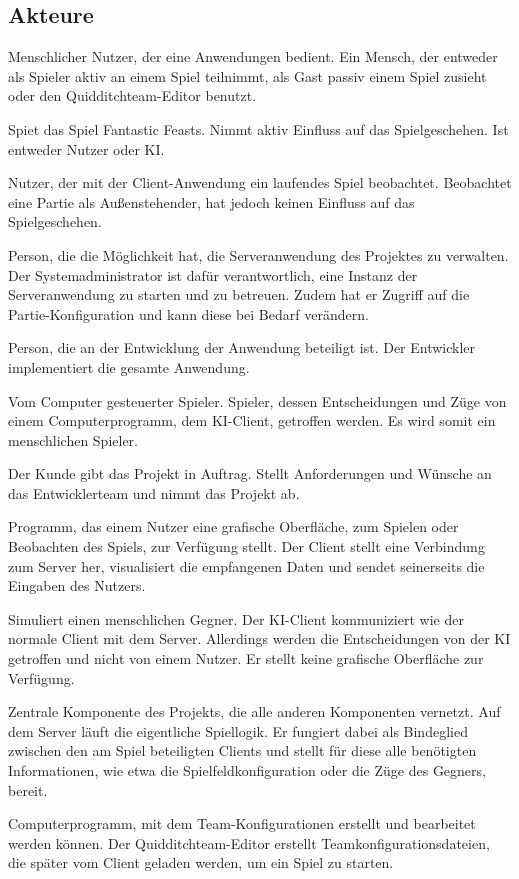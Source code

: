 \subsection{Akteure}

        {Menschlicher Nutzer, der eine Anwendungen bedient.}
        {Ein Mensch, der entweder als Spieler aktiv an einem Spiel teilnimmt, als Gast passiv einem Spiel zusieht oder den Quidditchteam-Editor benutzt.}
        
        {Spiet das Spiel \glqq{}Fantastic Feasts\grqq{}.}
        {Nimmt aktiv Einfluss auf das Spielgeschehen. Ist entweder Nutzer oder KI.}
        
        {Nutzer, der mit der Client-Anwendung ein laufendes Spiel beobachtet.}
        {Beobachtet eine Partie als Außenstehender, hat jedoch keinen Einfluss auf das Spielgeschehen.}
    
        {Person, die die Möglichkeit hat, die Serveranwendung des Projektes zu verwalten.}
        {Der Systemadministrator ist dafür verantwortlich, eine Instanz der Serveranwendung zu starten und zu betreuen. Zudem hat er Zugriff auf die Partie-Konfiguration und kann diese bei Bedarf verändern.}

        {Person, die an der Entwicklung der Anwendung beteiligt ist.}
        {Der Entwickler implementiert die gesamte Anwendung.}	

        {Vom Computer gesteuerter Spieler.}
        {Spieler, dessen Entscheidungen und Züge von einem Computerprogramm, dem KI-Client, getroffen werden. Es wird somit ein menschlichen Spieler.}

        {Der Kunde gibt das Projekt in Auftrag.}
        {Stellt Anforderungen und Wünsche an das Entwicklerteam und nimmt das Projekt ab.}

        {Programm, das einem Nutzer eine grafische Oberfläche, zum Spielen oder Beobachten des Spiels, zur Verfügung stellt.}
        {Der Client stellt eine Verbindung zum Server her, visualisiert die empfangenen Daten und sendet seinerseits die Eingaben des Nutzers.}

        {Simuliert einen menschlichen Gegner.}
        {Der KI-Client kommuniziert wie der normale Client mit dem Server. Allerdings werden die Entscheidungen von der KI getroffen und nicht von einem Nutzer. Er stellt keine grafische Oberfläche zur Verfügung.}

        {Zentrale Komponente des Projekts, die alle anderen Komponenten vernetzt.}
        {Auf dem Server läuft die eigentliche Spiellogik. Er fungiert dabei als Bindeglied zwischen den am Spiel beteiligten Clients und stellt für diese alle benötigten Informationen, wie etwa die Spielfeldkonfiguration oder die Züge des Gegners, bereit.}
        
        {Computerprogramm, mit dem Team-Konfigurationen erstellt und bearbeitet werden können.}
        {Der Quidditchteam-Editor erstellt Teamkonfigurationsdateien, die später vom Client geladen werden, um ein Spiel zu starten.}
